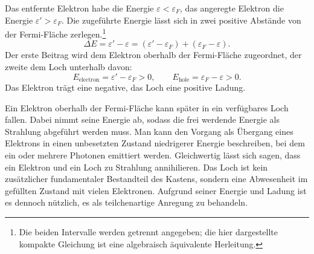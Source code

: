 Das entfernte Elektron habe die Energie \(\varepsilon<\varepsilon_F\), das angeregte Elektron die Energie \(\varepsilon'>\varepsilon_F\). Die zugeführte Energie lässt sich in zwei positive Abstände von der Fermi-Fläche zerlegen.\footnote{Die beiden Intervalle werden getrennt angegeben; die hier dargestellte kompakte Gleichung ist eine algebraisch äquivalente Herleitung.}
\begin{equation}
\Delta E
=\varepsilon'-\varepsilon
=(\varepsilon'-\varepsilon_F)+(\varepsilon_F-\varepsilon).
\end{equation}
Der erste Beitrag wird dem Elektron oberhalb der Fermi-Fläche zugeordnet, der zweite dem Loch unterhalb davon:
\begin{equation}
E_{\mathrm{electron}}=\varepsilon'-\varepsilon_F>0,
\qquad
E_{\mathrm{hole}}=\varepsilon_F-\varepsilon>0.
\end{equation}
Das Elektron trägt eine negative, das Loch eine positive Ladung.

Ein Elektron oberhalb der Fermi-Fläche kann später in ein verfügbares Loch fallen. Dabei nimmt seine Energie ab, sodass die frei werdende Energie als Strahlung abgeführt werden muss. Man kann den Vorgang als Übergang eines Elektrons in einen unbesetzten Zustand niedrigerer Energie beschreiben, bei dem ein oder mehrere Photonen emittiert werden. Gleichwertig lässt sich sagen, dass ein Elektron und ein Loch zu Strahlung annihilieren. Das Loch ist kein zusätzlicher fundamentaler Bestandteil des Kastens, sondern eine Abwesenheit im gefüllten Zustand mit vielen Elektronen. Aufgrund seiner Energie und Ladung ist es dennoch nützlich, es als teilchenartige Anregung zu behandeln.

\begin{classroomqa}
\end{classroomqa}

